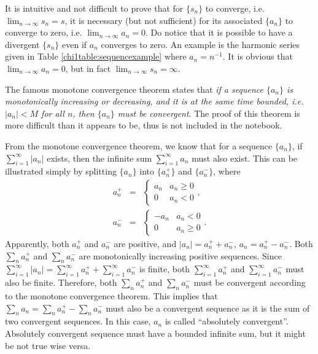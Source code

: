 It is intuitive and not difficult to prove that for $\{s_n\}$ to converge, i.e. $\lim_{n\rightarrow\infty}s_n = s$, it is necessary (but not sufficient) for its associated $\{a_n\}$ to converge to zero, i.e. $\lim_{n\rightarrow\infty}a_n = 0$. Do notice that it is possible to have a divergent $\{s_n\}$ even if $a_n$ converges to zero. An example is the harmonic series given in Table \ref{chi1table:sequencexample} where $a_n = n^{-1}$. It is obvious that $\lim_{n\rightarrow\infty}a_n=0$, but in fact $\lim_{n\rightarrow\infty}s_n=\infty$.

The famous monotone convergence theorem states that \textit{if a sequence $\{a_n\}$ is monotonically increasing or decreasing, and it is at the same time bounded, i.e. $|a_n| < M$ for all $n$, then $\{a_n\}$ must be convergent}. The proof of this theorem is more difficult than it appears to be, thus is not included in the notebook.

From the monotone convergence theorem, we know that for a sequence $\{a_n\}$, if $\sum_{i=1}^{\infty}|a_n|$ exists, then the infinite sum $\sum_{i=1}^{\infty}a_n$ must also exist. This can be illustrated simply by splitting $\{a_n\}$ into $\{a_n^+\}$ and $\{a_n^-\}$, where
\begin{eqnarray}
  a_n^+ &=& \left\{\begin{array}{cc}
                     a_n & a_n \geq 0 \\
                     0 & a_n < 0
                   \end{array}\right.,  \nonumber \\
  a_n^- &=& \left\{\begin{array}{cc}
                     -a_n & a_n < 0 \\
                     0 & a_n \geq 0
                   \end{array}\right.. \nonumber
\end{eqnarray}
Apparently, both $a_n^+$ and $a_n^-$ are positive, and $|a_n| = a_n^+ + a_n^-$, $a_n = a_n^+ - a_n^-$. Both $\sum_na_n^+$ and $\sum_na_n^-$ are monotonically increasing positive sequences. Since $\sum_{i=1}^{\infty}|a_n| = \sum_{i=1}^{\infty}a_n^+ + \sum_{i=1}^{\infty}a_n^-$ is finite, both $\sum_{i=1}^{\infty}a_n^+$ and $\sum_{i=1}^{\infty}a_n^-$ must also be finite. Therefore, both $\sum_na_n^+$ and $\sum_na_n^-$ must be convergent according to the monotone convergence theorem. This implies that $\sum_n a_n = \sum_n a_n^+ - \sum_n a_n^-$ must also be a convergent sequence as it is the sum of two convergent sequences. In this case, $a_n$ is called ``absolutely convergent''. Absolutely convergent sequence must have a bounded infinite sum, but it might be not true wise versa.

